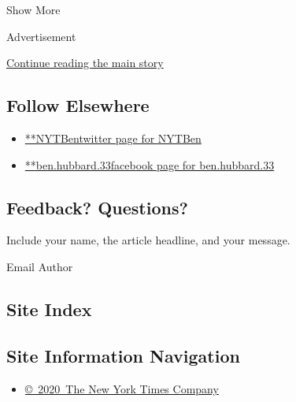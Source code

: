 Show More

Advertisement

\protect\hyperlink{after-mid2}{Continue reading the main story}

\hypertarget{follow-elsewhere}{%
\subsection{Follow Elsewhere}\label{follow-elsewhere}}

\begin{itemize}
\tightlist
\item
  \href{https://twitter.com/NYTBen}{**NYTBentwitter page for NYTBen}
\item
  \href{https://www.facebook.com/ben.hubbard.33}{**ben.hubbard.33facebook
  page for ben.hubbard.33}
\end{itemize}

\hypertarget{feedback-questions}{%
\subsection{Feedback? Questions?}\label{feedback-questions}}

Include your name, the article headline, and your message.

Email Author

\hypertarget{site-index}{%
\subsection{Site Index}\label{site-index}}

\hypertarget{site-information-navigation}{%
\subsection{Site Information
Navigation}\label{site-information-navigation}}

\begin{itemize}
\tightlist
\item
  \href{https://help.nytimes.com/hc/en-us/articles/115014792127-Copyright-notice}{©~2020~The
  New York Times Company}
\end{itemize}

